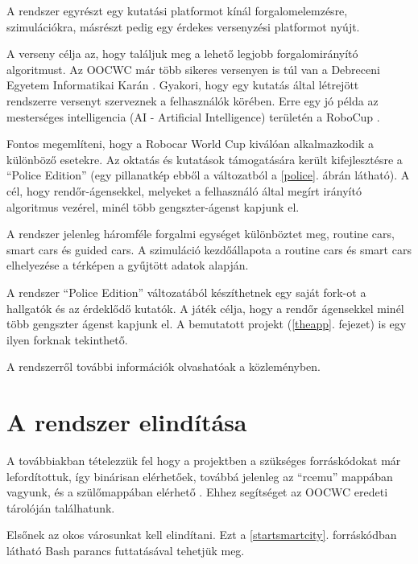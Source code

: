 \documentclass[a4paper,12pt]{report}
\begin{document}
A rendszer egyrészt egy kutatási platformot kínál forgalomelemzésre, szimulációkra, másrészt pedig egy érdekes versenyzési platformot nyújt.

\vspace{2mm}
A verseny célja az, hogy találjuk meg a lehető legjobb forgalomirányító algoritmust. Az OOCWC már több sikeres versenyen is túl van a Debreceni Egyetem Informatikai Karán \cite{competitions}. Gyakori, hogy egy kutatás által létrejött rendszerre versenyt szerveznek a felhasználók körében. Erre egy jó példa az mesterséges intelligencia (AI - Artificial Intelligence) területén a RoboCup \cite{robocup}.

\vspace{2mm}
Fontos megemlíteni, hogy a Robocar World Cup kiválóan alkalmazkodik a különböző esetekre. Az oktatás és kutatások támogatására került kifejlesztésre a ``Police Edition'' (egy pillanatkép ebből a változatból a \ref{police}. ábrán látható). A cél, hogy rendőr-ágensekkel, melyeket a felhasználó által megírt irányító algoritmus vezérel, minél több gengszter-ágenst kapjunk el.

\vspace{2mm}
A rendszer jelenleg háromféle forgalmi egységet különböztet meg, routine cars, smart cars és guided cars. A szimuláció kezdőállapota a routine cars és smart cars elhelyezése a térképen a gyűjtött adatok alapján.

\vspace{2mm}
A rendszer ``Police Edition'' változatából készíthetnek egy saját fork-ot a hallgatók és az érdeklődő kutatók. A játék célja, hogy a rendőr ágensekkel minél több gengszter ágenst kapjunk el. A bemutatott projekt (\ref{theapp}. fejezet) is egy ilyen forknak tekinthető.

\vspace{2mm}
A rendszerről további információk olvashatóak a \cite{infocomjournal} közleményben.

\section{A rendszer elindítása}
\label{howtostart}

A továbbiakban tételezzük fel hogy a projektben a szükséges forráskódokat már lefordítottuk, így binárisan elérhetőek, továbbá jelenleg az ``rcemu'' mappában vagyunk, és a szülőmappában elérhető . Ehhez segítséget az OOCWC eredeti tárolóján \cite{oocwcrepo} találhatunk.

\vspace{2mm}
Elsőnek az okos városunkat kell elindítani. Ezt a \ref{startsmartcity}. forráskódban látható Bash parancs futtatásával  tehetjük meg.
\end{document}
